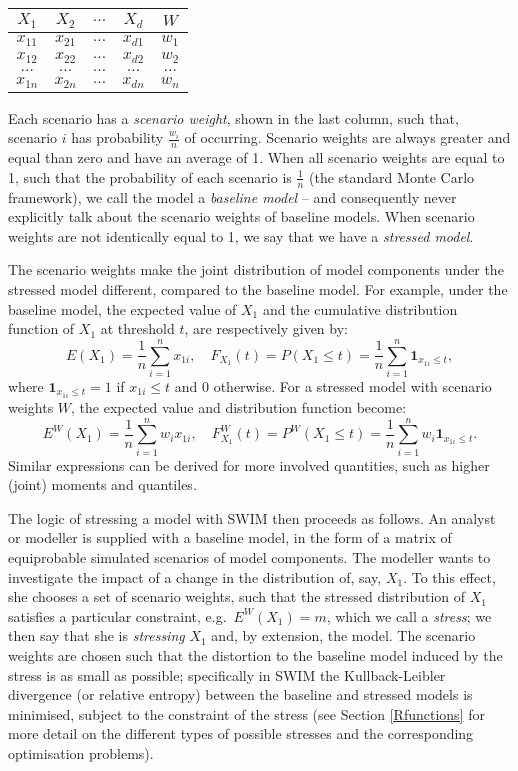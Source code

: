 \documentclass[]{article}
\begin{document}
\begin{longtable}[]{@{}ccccc@{}}
\toprule
\(X_1\) & \(X_2\) & \(\dots\) & \(X_d\) & \(W\)\tabularnewline
\midrule
\endhead
\(x_{11}\) & \(x_{21}\) & \(\dots\) & \(x_{d1}\) & \(w_1\)\tabularnewline
\(x_{12}\) & \(x_{22}\) & \(\dots\) & \(x_{d2}\) & \(w_2\)\tabularnewline
\(\dots\) & \(\dots\) & \(\dots\) & \(\dots\) & \(\dots\)\tabularnewline
\(x_{1n}\) & \(x_{2n}\) & \(\dots\) & \(x_{dn}\) & \(w_n\)\tabularnewline
\bottomrule
\end{longtable}

Each scenario has a \emph{scenario weight}, shown in the last column, such that, scenario \(i\) has probability \(\frac{w_i}{n}\) of occurring. Scenario weights are always greater and equal than zero and have an average of 1. When all scenario weights are equal to 1, such that the probability of each scenario is \(\frac 1 n\) (the standard Monte Carlo framework), we call the model a \emph{baseline model} -- and consequently never explicitly talk about the scenario weights of baseline models. When scenario weights are not identically equal to 1, we say that we have a \emph{stressed model}.

The scenario weights make the joint distribution of model components under the stressed model different, compared to the baseline model. For example, under the baseline model, the expected value of \(X_1\) and the cumulative distribution function of \(X_1\) at threshold \(t\), are respectively given by:
\[
E(X_1)=\frac 1  n \sum_{i=1}^nx_{1i},\quad F_{X_1}(t)= P(X_1\leq t)=\frac 1 n \sum_{i=1}^n \mathbf 1 _{x_{1i}\leq t},
\]
where \(\mathbf 1 _{x_{1i}\leq t}=1\) if \(x_{1i}\leq t\) and \(0\) otherwise. For a stressed model with scenario weights \(W\), the expected value and distribution function become:
\[
E^W(X_1)=\frac 1  n \sum_{i=1}^n w_i x_{1i},\quad F_{X_1}^W(t)=P^W(X_1\leq t)=\frac 1 n \sum_{i=1}^n w_i \mathbf 1 _{x_{1i}\leq t}.
\]
Similar expressions can be derived for more involved quantities, such as higher (joint) moments and quantiles.

The logic of stressing a model with SWIM then proceeds as follows. An analyst or modeller is supplied with a baseline model, in the form of a matrix of equiprobable simulated scenarios of model components. The modeller wants to investigate the impact of a change in the distribution of, say, \(X_1\). To this effect, she chooses a set of scenario weights, such that the stressed distribution of \(X_1\) satisfies a particular constraint, e.g.~\(E^W(X_1)=m\), which we call a \emph{stress}; we then say that she is \emph{stressing} \(X_1\) and, by extension, the model. The scenario weights are chosen such that the distortion to the baseline model induced by the stress is as small as possible; specifically in SWIM the Kullback-Leibler divergence (or relative entropy) between the baseline and stressed models is minimised, subject to the constraint of the stress (see Section \ref{Rfunctions} for more detail on the different types of possible stresses and the corresponding optimisation problems).
\end{document}
